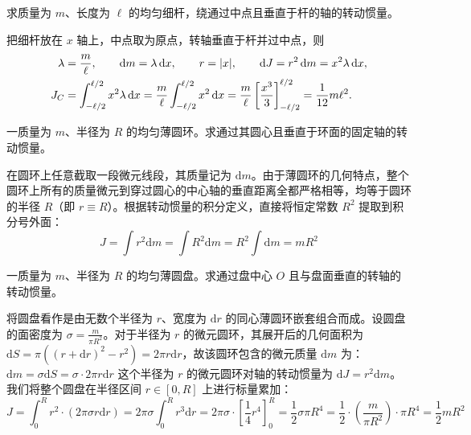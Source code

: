 \documentclass[lang=cn,11pt]{elegantbook}
\begin{document}
\begin{exercise}[均匀细杆绕中心的转动惯量]
求质量为 \(m\)、长度为 \(\ell\) 的均匀细杆，绕通过中点且垂直于杆的轴的转动惯量。
\end{exercise}
\begin{solution}
把细杆放在 \(x\) 轴上，中点取为原点，转轴垂直于杆并过中点，则
\[
\begin{aligned}
\lambda&=\frac{m}{\ell},\qquad \dd m=\lambda\,\dd x,\qquad r=\abs{x},\qquad
\dd J=r^2\,\dd m=x^2\lambda\,\dd x,\\
J_C&=\int_{-\ell/2}^{\ell/2}x^2\lambda\,\dd x
=\frac{m}{\ell}\int_{-\ell/2}^{\ell/2}x^2\,\dd x
=\frac{m}{\ell}\left[\frac{x^3}{3}\right]_{-\ell/2}^{\ell/2}
=\frac{1}{12}m\ell^2.
\end{aligned}
\]
\end{solution}

\begin{exercise}
一质量为 $m$、半径为 $R$ 的均匀薄圆环。求通过其圆心且垂直于环面的固定轴的转动惯量。
\end{exercise}
\begin{solution}
在圆环上任意截取一段微元线段，其质量记为 $\mathrm{d}m$。由于薄圆环的几何特点，整个圆环上所有的质量微元到穿过圆心的中心轴的垂直距离全都严格相等，均等于圆环的半径 $R$（即 $r \equiv R$）。根据转动惯量的积分定义，直接将恒定常数 $R^2$ 提取到积分号外面：$$J = \int r^2 \mathrm{d}m = \int R^2 \mathrm{d}m = R^2 \int \mathrm{d}m=mR^2$$
\end{solution}

\begin{exercise}
 一质量为 $m$、半径为 $R$ 的均匀薄圆盘。求通过盘中心 $O$ 且与盘面垂直的转轴的转动惯量。
\end{exercise}
\begin{solution}
将圆盘看作是由无数个半径为 $r$、宽度为 $\mathrm{d}r$ 的同心薄圆环嵌套组合而成。设圆盘的面密度为 $\sigma = \frac{m}{\pi R^2}$。对于半径为 $r$ 的微元圆环，其展开后的几何面积为 $\mathrm{d}S=\pi((r+\mathrm{d}r)^2-r^2) = 2\pi r \mathrm{d}r$，故该圆环包含的微元质量 $\mathrm{d}m$ 为： \(\mathrm{d}m = \sigma \mathrm{d}S = \sigma \cdot 2\pi r \mathrm{d}r\) 
这个半径为 $r$ 的微元圆环对轴的转动惯量为 $\mathrm{d}J = r^2 \mathrm{d}m$。我们将整个圆盘在半径区间 $r \in [0, R]$ 上进行标量累加：$$J = \int_{0}^{R} r^2 \cdot (2\pi \sigma r \mathrm{d}r) = 2\pi \sigma \int_{0}^{R} r^3 \mathrm{d}r= 2\pi \sigma \cdot \left[ \frac{1}{4}r^4 \right]_0^R = \frac{1}{2}\sigma \pi R^4 = \frac{1}{2} \cdot \left(\frac{m}{\pi R^2}\right) \cdot \pi R^4 = \frac{1}{2}mR^2$$
\end{solution}
\end{document}
